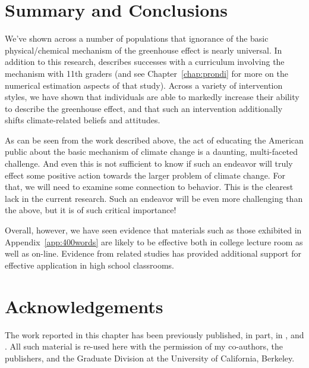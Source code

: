 \section{Summary and Conclusions}

We've shown across a number of populations that ignorance of the basic
physical/chemical mechanism of the greenhouse effect is nearly universal. In
addition to this research, \textcite{felipe_numerical_2012} describes successes
with a curriculum involving the mechanism with 11th graders (and see
Chapter~\ref{chap:prondi} for more on the numerical estimation aspects of that
study). Across a variety of intervention styles, we have shown that individuals
are able to markedly increase their ability to describe the greenhouse effect,
and that such an intervention additionally shifts climate-related beliefs and
attitudes.


As can be seen from the work described above, the act of educating the American
public about the basic mechanism of climate change is a daunting, multi-faceted
challenge. And even this is not sufficient to know if such an endeavor will
truly effect some positive action towards the larger problem of climate change.
For that, we will need to examine some connection to behavior. This is the
clearest lack in the current research. Such an endeavor will be even more
challenging than the above, but it is of such critical importance! 

Overall, however, we have seen evidence that materials such as those exhibited
in Appendix~\ref{app:400words} are likely to be effective both in college
lecture room as well as on-line. Evidence from related studies has provided
additional support for effective application in high school classrooms.



\section*{Acknowledgements}

The work reported in this chapter has been previously published, in part, in
\textcite{ranney_changing_2012,ranney_improving_2012_f}, and
\textcite{clark_knowledge_inpress}.  All such material is re-used here with the
permission of my co-authors, the publishers, and the Graduate Division at the
University of California, Berkeley.
